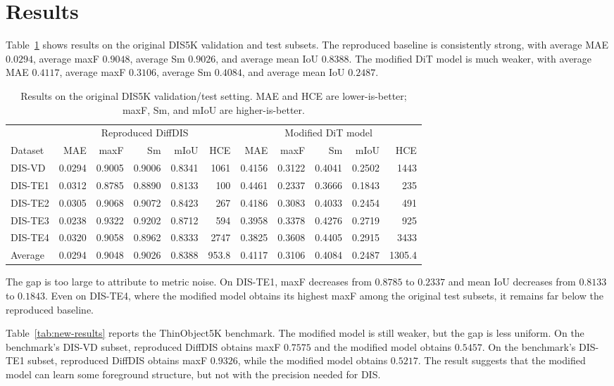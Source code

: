 \documentclass[sigconf,nonacm]{acmart}
\begin{document}
\section{Results}
Table~\ref{tab:original-results} shows results on the original DIS5K validation and test subsets. The reproduced baseline is consistently strong, with average MAE $0.0294$, average maxF $0.9048$, average Sm $0.9026$, and average mean IoU $0.8388$. The modified DiT model is much weaker, with average MAE $0.4117$, average maxF $0.3106$, average Sm $0.4084$, and average mean IoU $0.2487$.

\begin{table}[t]
\centering
\caption{Results on the original DIS5K validation/test setting. MAE and HCE are lower-is-better; maxF, Sm, and mIoU are higher-is-better.}
\label{tab:original-results}
\begin{tabular}{lrrrrrrrrrr}
\toprule
& \multicolumn{5}{c}{Reproduced DiffDIS} & \multicolumn{5}{c}{Modified DiT model} \\
\cmidrule(lr){2-6}\cmidrule(lr){7-11}
Dataset & MAE & maxF & Sm & mIoU & HCE & MAE & maxF & Sm & mIoU & HCE \\
\midrule
DIS-VD  & 0.0294 & 0.9005 & 0.9006 & 0.8341 & 1061 & 0.4156 & 0.3122 & 0.4041 & 0.2502 & 1443 \\
DIS-TE1 & 0.0312 & 0.8785 & 0.8890 & 0.8133 & 100  & 0.4461 & 0.2337 & 0.3666 & 0.1843 & 235 \\
DIS-TE2 & 0.0305 & 0.9068 & 0.9072 & 0.8423 & 267  & 0.4186 & 0.3083 & 0.4033 & 0.2454 & 491 \\
DIS-TE3 & 0.0238 & 0.9322 & 0.9202 & 0.8712 & 594  & 0.3958 & 0.3378 & 0.4276 & 0.2719 & 925 \\
DIS-TE4 & 0.0320 & 0.9058 & 0.8962 & 0.8333 & 2747 & 0.3825 & 0.3608 & 0.4405 & 0.2915 & 3433 \\
\midrule
Average & 0.0294 & 0.9048 & 0.9026 & 0.8388 & 953.8 & 0.4117 & 0.3106 & 0.4084 & 0.2487 & 1305.4 \\
\bottomrule
\end{tabular}
\end{table}

The gap is too large to attribute to metric noise. On DIS-TE1, maxF decreases from $0.8785$ to $0.2337$ and mean IoU decreases from $0.8133$ to $0.1843$. Even on DIS-TE4, where the modified model obtains its highest maxF among the original test subsets, it remains far below the reproduced baseline.

Table~\ref{tab:new-results} reports the ThinObject5K benchmark. The modified model is still weaker, but the gap is less uniform. On the benchmark's DIS-VD subset, reproduced DiffDIS obtains maxF $0.7575$ and the modified model obtains $0.5457$. On the benchmark's DIS-TE1 subset, reproduced DiffDIS obtains maxF $0.9326$, while the modified model obtains $0.5217$. The result suggests that the modified model can learn some foreground structure, but not with the precision needed for DIS.
\end{document}
